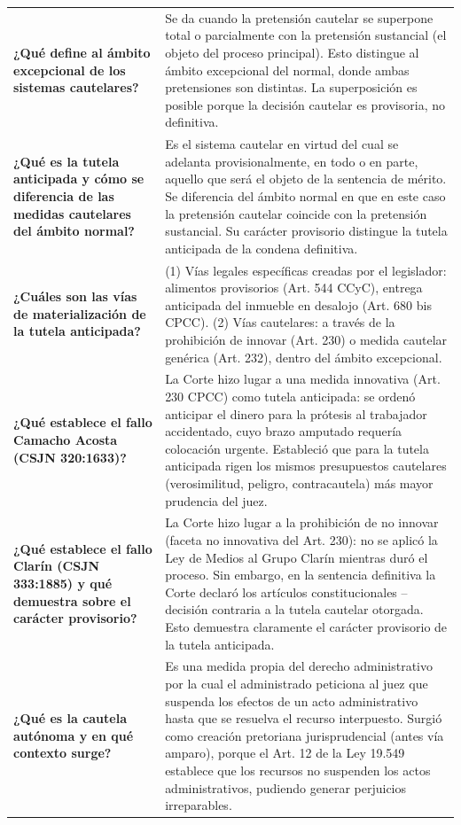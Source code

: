 \documentclass[12pt,oneside]{book}
\begin{document}
\begin{longtable}{
    >{\raggedright\arraybackslash}p{}
    >{\raggedright\arraybackslash}p{}
}
\textbf{¿Qué define al ámbito excepcional de los sistemas cautelares?} &
Se da cuando la pretensión cautelar se superpone total o parcialmente con la pretensión sustancial (el objeto del proceso principal). Esto distingue al ámbito excepcional del normal, donde ambas pretensiones son distintas. La superposición es posible porque la decisión cautelar es provisoria, no definitiva. \\

\textbf{¿Qué es la tutela anticipada y cómo se diferencia de las medidas cautelares del ámbito normal?} &
Es el sistema cautelar en virtud del cual se adelanta provisionalmente, en todo o en parte, aquello que será el objeto de la sentencia de mérito. Se diferencia del ámbito normal en que en este caso la pretensión cautelar coincide con la pretensión sustancial. Su carácter provisorio distingue la tutela anticipada de la condena definitiva. \\

\textbf{¿Cuáles son las vías de materialización de la tutela anticipada?} &
(1) Vías legales específicas creadas por el legislador: alimentos provisorios (Art. 544 CCyC), entrega anticipada del inmueble en desalojo (Art. 680 bis CPCC). (2) Vías cautelares: a través de la prohibición de innovar (Art. 230) o medida cautelar genérica (Art. 232), dentro del ámbito excepcional. \\

\textbf{¿Qué establece el fallo Camacho Acosta (CSJN 320:1633)?} &
La Corte hizo lugar a una medida innovativa (Art. 230 CPCC) como tutela anticipada: se ordenó anticipar el dinero para la prótesis al trabajador accidentado, cuyo brazo amputado requería colocación urgente. Estableció que para la tutela anticipada rigen los mismos presupuestos cautelares (verosimilitud, peligro, contracautela) más mayor prudencia del juez. \\

\textbf{¿Qué establece el fallo Clarín (CSJN 333:1885) y qué demuestra sobre el carácter provisorio?} &
La Corte hizo lugar a la prohibición de no innovar (faceta no innovativa del Art. 230): no se aplicó la Ley de Medios al Grupo Clarín mientras duró el proceso. Sin embargo, en la sentencia definitiva la Corte declaró los artículos constitucionales --decisión contraria a la tutela cautelar otorgada. Esto demuestra claramente el carácter provisorio de la tutela anticipada. \\

\textbf{¿Qué es la cautela autónoma y en qué contexto surge?} &
Es una medida propia del derecho administrativo por la cual el administrado peticiona al juez que suspenda los efectos de un acto administrativo hasta que se resuelva el recurso interpuesto. Surgió como creación pretoriana jurisprudencial (antes vía amparo), porque el Art. 12 de la Ley 19.549 establece que los recursos no suspenden los actos administrativos, pudiendo generar perjuicios irreparables. \\


\end{longtable}
\end{document}
